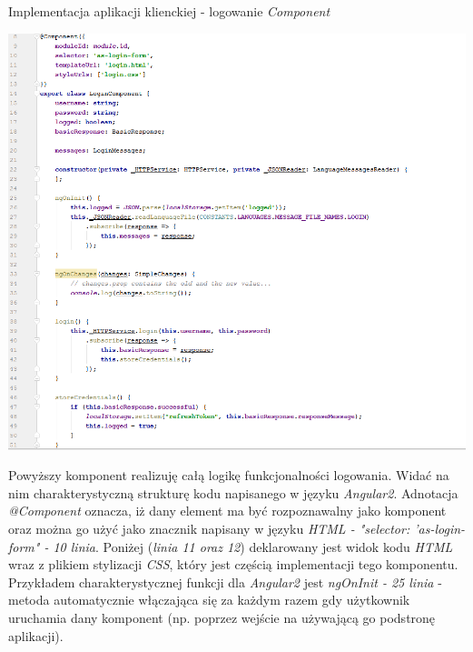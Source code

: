 \documentclass[10pt,titlepage]{article} %
\begin{document}
\begin{listing}[H]
\caption[Implementacja aplikacji klienckiej - logowanie \textit{Component}]{Implementacja aplikacji klienckiej - logowanie \textit{Component}}
\includegraphics[width=1.0\textwidth, height=0.8\textheight]{img/sekcja3/frontend/logowanieComponent}
\end{listing}
Powyższy komponent realizuję całą logikę funkcjonalności logowania. Widać na nim charakterystyczną strukturę kodu napisanego w języku \textit{Angular2}. Adnotacja \textit{@Component} oznacza, iż dany element ma być rozpoznawalny jako komponent oraz można go użyć jako znacznik napisany w języku  \textit{HTML - "selector: 'as-login-form" - 10 linia}. Poniżej (\textit{linia 11 oraz 12}) deklarowany jest widok kodu \textit{HTML} wraz z plikiem stylizacji \textit{CSS}, który jest częścią implementacji tego komponentu. Przykładem charakterystycznej funkcji dla \textit{Angular2} jest \textit{ngOnInit - 25 linia} - metoda automatycznie włączająca się za każdym razem gdy użytkownik uruchamia dany komponent (np. poprzez wejście na używającą go podstronę aplikacji).

\end{document}
